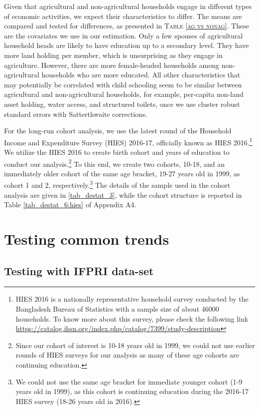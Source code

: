 \documentclass[12pt,letterpaper]{article}
\newcommand{\0}{\ensuremath{\mbox{\boldmath $0$}}}
\begin{document}
Given that agricultural and non-agricultural households engage in different types of economic activities, we expect their characteristics to differ. The means are compared and tested for differences, as presented in \textsc{\small Table \ref{ag vs nonag}}. These are the covariates we use in our estimation. Only a few spouses of agricultural household heads are likely to have education up to a secondary level. They have more land holding per member, which is unsurprising as they engage in agriculture. However, there are more female-headed households among non-agricultural households who are more educated. All other characteristics that may potentially be correlated with child schooling seem to be similar between agricultural and non-agricultural households, for example, per-capita non-land asset holding, water access, and structured toilets, once we use cluster robust standard errors with Satterthwaite corrections. 

For the long-run cohort analysis, we use the latest round of the Household Income and Expenditure Survey (HIES) 2016-17, officially known as HIES 2016.\footnote{HIES 2016 is a nationally representative household survey conducted by the Bangladesh Bureau of Statistics with a sample size of about 46000 households. To know more about this survey, please check the following link \url{https://catalog.ihsn.org/index.php/catalog/7399/study-description}} We utilize the HIES 2016 to create birth cohort and years of education to conduct our analysis.\footnote{Since our cohort of interest is 10-18 years old in 1999, we could not use earlier rounds of HIES surveys for our analysis as many of these age cohorts are continuing education.} To this end, we create two cohorts, 10-18, and an immediately older cohort of the same age bracket, 19-27 years old in 1999, as cohort 1 and 2, respectively.\footnote{We could not use the same age bracket for immediate younger cohort (1-9 years old in 1999), as this cohort is continuing education during the 2016-17 HIES survey (18-26 years old in 2016).} The details of the sample used in the cohort analysis are given in \ref{tab_destat_3}, while the cohort structure is reported in Table \ref{tab_destat_6:hies} of Appendix A4.  


\section{Testing common trends}

\subsection{Testing with IFPRI data-set}
\end{document}
